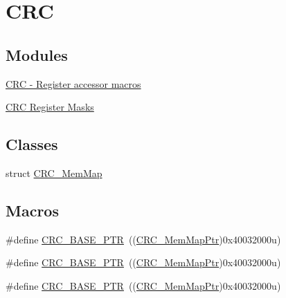 \hypertarget{group___c_r_c___peripheral}{}\section{C\+RC}
\label{group___c_r_c___peripheral}
\subsection*{Modules}
\begin{DoxyCompactItemize}
\item 
\hyperlink{group___c_r_c___register___accessor___macros}{C\+R\+C -\/ Register accessor macros}
\item 
\hyperlink{group___c_r_c___register___masks}{C\+R\+C Register Masks}
\end{DoxyCompactItemize}
\subsection*{Classes}
\begin{DoxyCompactItemize}
\item 
struct \hyperlink{struct_c_r_c___mem_map}{C\+R\+C\+\_\+\+Mem\+Map}
\end{DoxyCompactItemize}
\subsection*{Macros}
\begin{DoxyCompactItemize}
\item 
\#define \hyperlink{group___c_r_c___peripheral_ga139bd4056b9e3c7987d28b6e955b662d}{C\+R\+C\+\_\+\+B\+A\+S\+E\+\_\+\+P\+TR}~((\hyperlink{group___c_r_c___peripheral_ga65ec00368ee39504a8a83cd736901b84}{C\+R\+C\+\_\+\+Mem\+Map\+Ptr})0x40032000u)
\item 
\#define \hyperlink{group___c_r_c___peripheral_ga139bd4056b9e3c7987d28b6e955b662d}{C\+R\+C\+\_\+\+B\+A\+S\+E\+\_\+\+P\+TR}~((\hyperlink{group___c_r_c___peripheral_ga65ec00368ee39504a8a83cd736901b84}{C\+R\+C\+\_\+\+Mem\+Map\+Ptr})0x40032000u)
\item 
\#define \hyperlink{group___c_r_c___peripheral_ga139bd4056b9e3c7987d28b6e955b662d}{C\+R\+C\+\_\+\+B\+A\+S\+E\+\_\+\+P\+TR}~((\hyperlink{group___c_r_c___peripheral_ga65ec00368ee39504a8a83cd736901b84}{C\+R\+C\+\_\+\+Mem\+Map\+Ptr})0x40032000u)
\end{DoxyCompactItemize}
